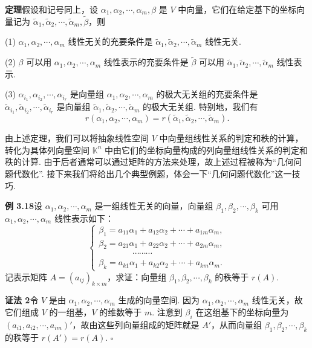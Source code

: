 \documentclass[UTF8,12pt,a4paper,fontset=fandol]{ctexart}
\begin{document}
\noindent\textbf{定理}\quad 假设和记号同上，设 $\alpha_1,\alpha_2,\cdots,\alpha_m,\beta$ 是 $V$ 中向量，它们在给定基下的坐标向量记为 $\widetilde\alpha_1,\widetilde\alpha_2,\cdots,\widetilde\alpha_m,\widetilde\beta$，则

(1) $\alpha_1,\alpha_2,\cdots,\alpha_m$ 线性无关的充要条件是 $\widetilde\alpha_1,\widetilde\alpha_2,\cdots,\widetilde\alpha_m$ 线性无关.

(2) $\beta$ 可以用 $\alpha_1,\alpha_2,\cdots,\alpha_m$ 线性表示的充要条件是 $\widetilde\beta$ 可以用 $\widetilde\alpha_1,\widetilde\alpha_2,\cdots,\widetilde\alpha_m$ 线性表示.

(3) $\alpha_{i_1},\alpha_{i_2},\cdots,\alpha_{i_r}$ 是向量组 $\alpha_1,\alpha_2,\cdots,\alpha_m$ 的极大无关组的充要条件是 $\widetilde\alpha_{i_1},\widetilde\alpha_{i_2},\cdots,\widetilde\alpha_{i_r}$ 是向量组 $\widetilde\alpha_1,\widetilde\alpha_2,\cdots,\widetilde\alpha_m$ 的极大无关组. 特别地，我们有
\[
r(\alpha_1,\alpha_2,\cdots,\alpha_m)=r(\widetilde\alpha_1,\widetilde\alpha_2,\cdots,\widetilde\alpha_m).
\]

由上述定理，我们可以将抽象线性空间 $V$ 中向量组线性关系的判定和秩的计算，转化为具体列向量空间 $\mathbb{K}^n$ 中由它们的坐标向量构成的列向量组线性关系的判定和秩的计算. 由于后者通常可以通过矩阵的方法来处理，故上述过程被称为“几何问题代数化”. 接下来我们将给出几个典型例题，体会一下“几何问题代数化”这一技巧.

\noindent\textbf{例 3.18}\quad 设 $\alpha_1,\alpha_2,\cdots,\alpha_m$ 是一组线性无关的向量，向量组 $\beta_1,\beta_2,\cdots,\beta_k$ 可用 $\alpha_1,\alpha_2,\cdots,\alpha_m$ 线性表示如下：
\[
\left\{
\begin{array}{l}
\beta_1=a_{11}\alpha_1+a_{12}\alpha_2+\cdots+a_{1m}\alpha_m,\\
\beta_2=a_{21}\alpha_1+a_{22}\alpha_2+\cdots+a_{2m}\alpha_m,\\
\hspace{4em}\cdots\cdots\cdots\\
\beta_k=a_{k1}\alpha_1+a_{k2}\alpha_2+\cdots+a_{km}\alpha_m.
\end{array}
\right.
\]
记表示矩阵 $A=(a_{ij})_{k\times m}$，求证：向量组 $\beta_1,\beta_2,\cdots,\beta_k$ 的秩等于 $r(A)$.

\noindent\textbf{证法 2}\quad 令 $V$ 是由 $\alpha_1,\alpha_2,\cdots,\alpha_m$ 生成的向量空间. 因为 $\alpha_1,\alpha_2,\cdots,\alpha_m$ 线性无关，故它们组成 $V$ 的一组基，$V$ 的维数等于 $m$. 注意到 $\beta_i$ 在这组基下的坐标向量为 $(a_{i1},a_{i2},\cdots,a_{im})'$，故由这些列向量组成的矩阵就是 $A'$，从而向量组 $\beta_1,\beta_2,\cdots,\beta_k$ 的秩等于 $r(A')=r(A)$. $\square$
\end{document}
